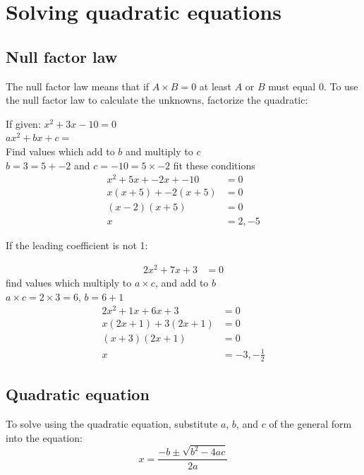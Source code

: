 \documentclass{book}
\begin{document}
\section{Solving quadratic equations}
\subsection{Null factor law}
The null factor law means that if $A \times B = 0$ at least $A$ or $B$ must equal 0.
To use the null factor law to calculate the unknowns, factorize the quadratic:
\begin{center}
	If given: $x^2 + 3x - 10 = 0$\\
	$ax^2 + bx + c = $\\
	Find values which add to $b$ and multiply to $c$\\
	$b = 3 = 5 + -2$ and $c = -10 = 5 \times -2$ fit these conditions
	\begin{align*}
		x^2 + 5x + -2x + -10 & = 0     \\
		x(x + 5) + -2(x + 5) & = 0     \\
		(x - 2)(x + 5)       & = 0     \\
		x                    & = 2, -5
	\end{align*}
\end{center}

If the leading coefficient is not 1:
\begin{center}
	\begin{align*}
		2x^2 + 7x + 3 & = 0
	\end{align*}
	find values which multiply to $a \times c$, and add to $b$\\
	$a \times c = 2 \times 3 = 6$, $b = 6 + 1$
	\begin{align*}
		2x^2 + 1x + 6x + 3    & = 0                \\
		x(2x + 1) + 3(2x + 1) & = 0                \\
		(x + 3)(2x + 1)       & = 0                \\
		x                     & = -3, -\frac{1}{2}
	\end{align*}
\end{center}

\subsection{Quadratic equation}
To solve using the quadratic equation, substitute $a$, $b$, and $c$ of the general form into the equation:
\[
	x = \frac{-b \pm \sqrt{b^2 - 4ac}}{2a}
\]
\end{document}
